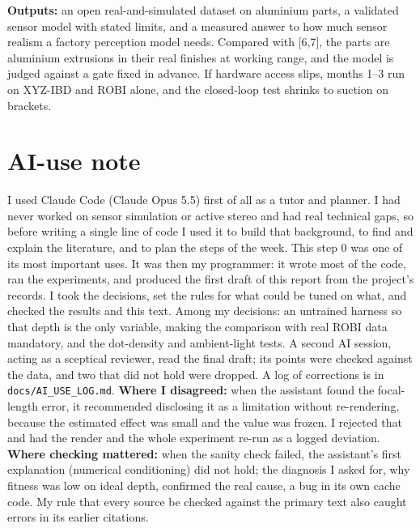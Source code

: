 \documentclass[10pt,a4paper]{article}
\newcommand{\para}[1]{\textbf{#1}\enspace}
\newcommand{\cte}[1]{[#1]}
\begin{document}
\para{Outputs:} an open real-and-simulated dataset on aluminium parts, a validated sensor model with stated limits, and a measured answer to how much sensor realism a factory perception model needs. Compared with \cte{6,7}, the parts are aluminium extrusions in their real finishes at working range, and the model is judged against a gate fixed in advance. If hardware access slips, months 1--3 run on XYZ-IBD and ROBI alone, and the closed-loop test shrinks to suction on brackets.

\section{AI-use note}
I used Claude Code (Claude Opus 5.5) first of all as a tutor and planner. I had never worked on sensor simulation or active stereo and had real technical gaps, so before writing a single line of code I used it to build that background, to find and explain the literature, and to plan the steps of the week. This step 0 was one of its most important uses. It was then my programmer: it wrote most of the code, ran the experiments, and produced the first draft of this report from the project's records. I took the decisions, set the rules for what could be tuned on what, and checked the results and this text. Among my decisions: an untrained harness so that depth is the only variable, making the comparison with real ROBI data mandatory, and the dot-density and ambient-light tests. A second AI session, acting as a sceptical reviewer, read the final draft; its points were checked against the data, and two that did not hold were dropped. A log of corrections is in \texttt{docs/AI\_USE\_LOG.md}.
\textbf{Where I disagreed:} when the assistant found the focal-length error, it recommended disclosing it as a limitation without re-rendering, because the estimated effect was small and the value was frozen. I rejected that and had the render and the whole experiment re-run as a logged deviation. \textbf{Where checking mattered:} when the sanity check failed, the assistant's first explanation (numerical conditioning) did not hold; the diagnosis I asked for, why fitness was low on ideal depth, confirmed the real cause, a bug in its own cache code. My rule that every source be checked against the primary text also caught errors in its earlier citations.
\end{document}
